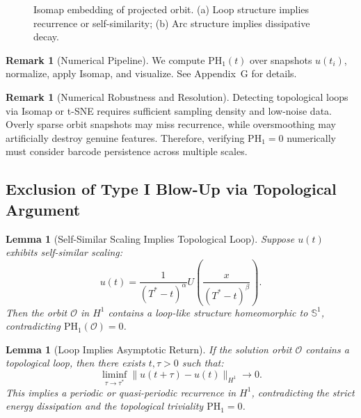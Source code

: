 \documentclass[11pt]{article}
\newtheorem{lemma}[theorem]{Lemma}
\theoremstyle{definition}
\newtheorem{remark}[theorem]{Remark}
\begin{document}
\usepackage{tikz}
\usepackage{caption}

\begin{figure}[h]
  \centering
  \caption{Isomap embedding of projected orbit. (a) Loop structure implies recurrence or self-similarity; (b) Arc structure implies dissipative decay.}
\end{figure}

\begin{remark}[Numerical Pipeline]
We compute $\mathrm{PH}_1(t)$ over snapshots $u(t_i)$, normalize, apply Isomap, and visualize. See Appendix~G for details.
\end{remark}

\begin{remark}[Numerical Robustness and Resolution]
Detecting topological loops via Isomap or t-SNE requires sufficient sampling density and low-noise data. Overly sparse orbit snapshots may miss recurrence, while oversmoothing may artificially destroy genuine features. Therefore, verifying $\mathrm{PH}_1 = 0$ numerically must consider barcode persistence across multiple scales.
\end{remark}

\subsection{Exclusion of Type I Blow-Up via Topological Argument}

\begin{lemma}[Self-Similar Scaling Implies Topological Loop]
Suppose $u(t)$ exhibits self-similar scaling:
\[
 u(t) = \frac{1}{(T^* - t)^\alpha} U\left( \frac{x}{(T^* - t)^\beta} \right).
\]
Then the orbit $\mathcal{O}$ in $H^1$ contains a loop-like structure homeomorphic to $\mathbb{S}^1$, contradicting $\mathrm{PH}_1(\mathcal{O}) = 0$.
\end{lemma}

\begin{lemma}[Loop Implies Asymptotic Return]
If the solution orbit $\mathcal{O}$ contains a topological loop, then there exists $t, \tau > 0$ such that:
\[
\liminf_{\tau \to \tau^*} \|u(t + \tau) - u(t)\|_{H^1} \to 0.
\]
This implies a periodic or quasi-periodic recurrence in $H^1$, contradicting the strict energy dissipation and the topological triviality $\mathrm{PH}_1 = 0$.
\end{lemma}
\end{document}
